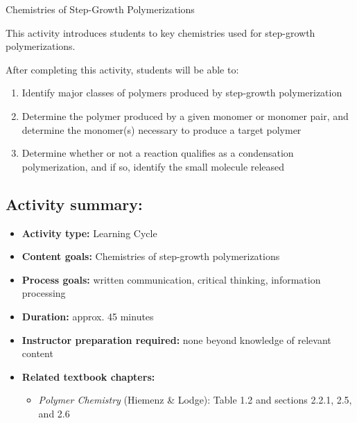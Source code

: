 %
%
%
%

\renewcommand{\figpath}{content/polymchem/stepgrowth/stepgrowth-chemistries/figs}
\renewcommand{\labelbase}{stepgrowth-chem}

\begin{activity}{Chemistries of Step-Growth Polymerizations}

\begin{instructornotes}

	This activity introduces students to key chemistries used for step-growth polymerizations.
	
	After completing this activity, students will be able to:
			\begin{enumerate}
				\item Identify major classes of polymers produced by step-growth polymerization
				\item Determine the polymer produced by a given monomer or monomer pair, and determine the monomer(s) necessary to produce a target polymer
				\item Determine whether or not a reaction qualifies as a condensation polymerization, and if so, identify the small molecule released
			\end{enumerate}
	
			
	\subsection*{Activity summary:}
	\begin{itemize}
		\item \textbf{Activity type:} Learning Cycle
		\item \textbf{Content goals:} Chemistries of step-growth polymerizations
		\item \textbf{Process goals:} %
			written communication, critical thinking, information processing
		\item \textbf{Duration:} approx. 45 minutes
		\item \textbf{Instructor preparation required:} none beyond knowledge of relevant content
		\item \textbf{Related textbook chapters:}
			\begin{itemize}
				\item \emph{Polymer Chemistry} (Hiemenz \& Lodge): Table 1.2 and sections 2.2.1, 2.5, and 2.6
			\end{itemize}
	\end{itemize}


\end{instructornotes}
\end{activity}
